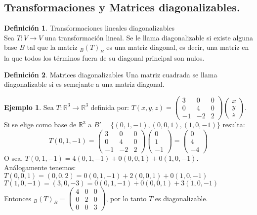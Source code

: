 \documentclass[10pt]{article}
\theoremstyle{definition}
\newtheorem{definition}{Definición}[section]
\newtheorem{example}{Ejemplo}[section]
\begin{document}
\subsection{Transformaciones y Matrices diagonalizables.}
\begin{definition}{Transformaciones lineales diagonalizables}
	\\Sea $T:V\to V$ una transformación lineal. Se le llama diagonalizable si existe alguna base $B$ tal que la matriz $_B(T)_B$ es una matriz diagonal, es decir, una matriz en la que todos los términos fuera de su diagonal principal son nulos.
\end{definition}
\begin{definition}{Matrices diagonalizables}
	Una matriz cuadrada se llama diagonalizable si es semejante a una matriz diagonal.
\end{definition}
\begin{example}
	Sea $T:\mathbb{R} ^3 \to\mathbb{R} ^3$ definida por: $T(x,y,z)=\begin{pmatrix} 3 & 0 & 0 \\ 0 & 4 & 0 \\ -1 & -2 & 2 \end{pmatrix} \begin{pmatrix} x \\ y \\ z \end{pmatrix} $.
	Si se elige como base de $\mathbb{R} ^3$ a $B'=\{(0,1,-1),(0,0,1),(1,0,-1)\}$ resulta:
	$$T(0,1,-1)=\begin{pmatrix} 3 & 0 & 0 \\ 0 & 4 & 0 \\ -1 & -2 & 2 \end{pmatrix} \begin{pmatrix} 0 \\ 1 \\ -1 \end{pmatrix}=\begin{pmatrix} 0 \\ 4 \\ -4 \end{pmatrix}$$
	O sea, $T(0,1,-1)=4(0,1,-1)+0(0,0,1)+0(1,0,-1)$.\\
	Análogamente tenemos:\\
	$T(0,0,1)=(0,0,2)=0(0,1,-1)+2(0,0,1)+0(1,0,-1)$\\
	$T(1,0,-1)=(3,0,-3)=0(0,1,-1)+0(0,0,1)+3(1,0,-1)$\\
	Entonces $_B(T)_B=\begin{pmatrix} 4&0&0 \\ 0&2&0 \\ 0&0&3 \end{pmatrix} $, por lo tanto $T$ es diagonalizable.
\end{example}
\end{document}
